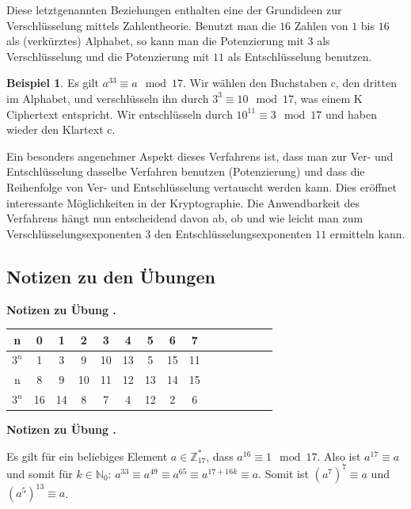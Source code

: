 \documentclass[%
11pt,%
twoside,%
titlepage,%
swissgerman,%
headsepline%
]{scrartcl}
\newcommand{\faReturnGray}{\textcolor{gray}{\faMailReply}} %
\theoremstyle{definition}
\newtheorem{bsp}{Beispiel}[subsection] %
\theoremstyle{plain}
\newcommand{\concatueb}[1]{ueb:#1}%
\newcommand{\concatlsg}[1]{lsg:#1}%
\newcounter{uebcounter}[section]
\renewcommand{\theuebcounter}{\thesection.\arabic{uebcounter}}  %
\newenvironment{lsg}[1]{%
    \par\noindent\textbf{Notizen zu Übung \theuebcounter\label{\concatlsg{#1}}}
    \hfill\hyperref[\concatueb{#1}]{\faReturnGray}\par %
}{%
    \par%
}
\begin{document}
Diese letztgenannten Beziehungen enthalten eine der Grundideen zur Verschlüsselung mittels Zahlentheorie. Benutzt man die $16$ Zahlen von $1$ bis $16$ als (verkürztes) Alphabet, so kann man die Potenzierung mit $3$ als Verschlüsselung und die Potenzierung mit $11$ als Entschlüsselung benutzen.

\begin{bsp}
Es gilt $a^{33}\equiv a\mod17$. Wir wählen den Buchstaben c, den dritten im Alphabet, und verschlüsseln ihn durch $3^3\equiv10\mod17$, was einem K Ciphertext entspricht. Wir entschlüsseln durch $10^{11}\equiv3\mod17$ und haben wieder den Klartext c.
\end{bsp}

Ein besonders angenehmer Aspekt dieses Verfahrens ist, dass man zur Ver- und Entschlüsselung dasselbe Verfahren benutzen (Potenzierung) und dass die Reihenfolge von Ver- und Entschlüsselung vertauscht werden kann. Dies eröffnet interessante Möglichkeiten in der Kryptographie. Die Anwendbarkeit des Verfahrens hängt nun entscheidend davon ab, ob und wie leicht man zum Verschlüsselungsexponenten $3$ den Entschlüsselungsexponenten $11$ ermitteln kann.

\clearpage

\subsection{Notizen zu den Übungen}

\begin{lsg}{modsiebzehn}
\begin{center}
\begin{tabular}{|c|c|c|c|c|c|c|c|c|c|c|c|c|c|c|}
\hline
n & 0 & 1 & 2&3&4&5&6&7\\
\hline
$3^n$&1&3&9&10&13&5&15&11\\
\hline\hline
n&8&9&10&11&12&13&14&15\\
\hline
$3^n$&16&14&8&7&4&12&2&6\\
\hline
\end{tabular}
\end{center}
\end{lsg}
\begin{lsg}{wurzeln}
Es gilt für ein beliebiges Element $a\in\mathbb{Z}_{17}^\ast$, dass $a^{16}\equiv1\mod{17}$. Also ist $a^{17}\equiv a$ und somit für $k\in\mathbb{N}_0$: $a^{33}\equiv a^{49}\equiv a^{65}\equiv a^{17+16k}\equiv a$. Somit ist $(a^7)^7\equiv a$ und $(a^5)^{13}\equiv a$.
\end{lsg}
\end{document}
